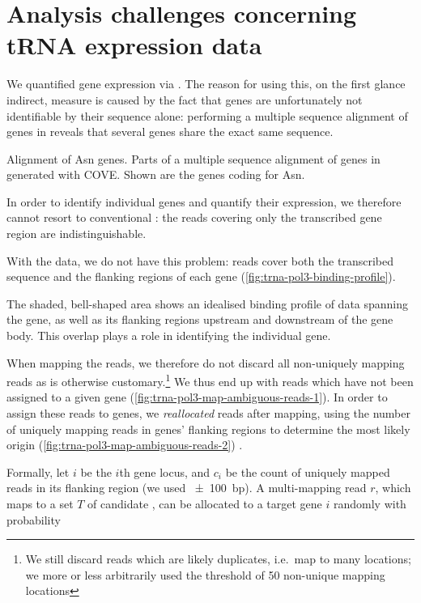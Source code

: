\chapter{Analysis challenges concerning tRNA expression data}

We quantified \trna gene expression via  \chipseq. The reason for using
this, on the first glance indirect, measure is caused by the fact that \trna
genes are unfortunately not identifiable by their sequence alone: performing a
multiple sequence alignment of \trna genes in \mmu reveals that several \trna
genes share the exact same sequence.

    {{\footnotesize}}
    {Alignment of Asn \trna genes.}
    {Parts of a multiple sequence alignment of \trna genes in \mmu generated
    with COVE\@. Shown are the \trna genes coding for Asn.}

In order to identify individual \trna genes and quantify their expression, we
therefore cannot resort to conventional \rnaseq: the \rna reads covering only
the transcribed gene region are indistinguishable.

With the  \chipseq data, we do not have this problem: reads cover both the
transcribed sequence and the flanking regions of each gene
(\cref{fig:trna-pol3-binding-profile}).

    {The shaded, bell-shaped area shows an idealised binding profile of \chipseq
    data spanning the \trna gene, as well as its flanking regions upstream
    and downstream of the gene body. This overlap plays a role in identifying
    the individual gene.}

When mapping the reads, we therefore do not discard all non-uniquely mapping
reads as is otherwise customary.\footnote{We still discard reads which are
likely \pcr duplicates, i.e.\ map to many locations; we more or less arbitrarily
used the threshold of \num{50} non-unique mapping locations} We thus end up with
reads which have not been assigned to a given \trna gene
(\cref{fig:trna-pol3-map-ambiguous-reads-1}). In order to assign these reads to
\trna genes, we \emph{reallocated} reads after mapping, using the number of
uniquely mapping reads in \trna genes’ flanking regions to determine the most
likely origin (\cref{fig:trna-pol3-map-ambiguous-reads-2}) \citep{Kutter:2011}.

Formally, let \(i\) be the \(i\)th \trna gene locus, and \(c_i\) be the count of
uniquely mapped reads in its flanking region (we used \SI{\pm100}{bp}). A
multi-mapping read \(r\), which maps to a set \(T\) of candidate \trna[s], can
be allocated to a target \trna gene \(i\) randomly with probability

